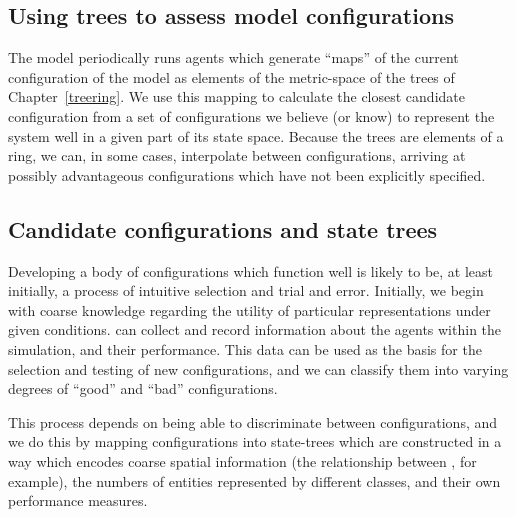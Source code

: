 \subsection{Using trees to assess model configurations}

The model periodically runs  agents which generate
``maps'' of the current configuration of the model as elements of
the metric-space of the trees of Chapter~\ref{treering}.  We use
this mapping to calculate the closest candidate configuration from a
set of configurations we believe (or know) to represent the system
well in a given part of its state space. Because the trees are
elements of a ring, we can, in some cases, interpolate between
configurations, arriving at possibly advantageous configurations which
have not been explicitly specified.

\subsection{Candidate configurations and state trees}

Developing a body of configurations which function well is likely to
be, at least initially, a process of intuitive selection and trial and
error. Initially, we begin with coarse knowledge regarding the utility
of particular representations under given conditions. \mloggers can
collect and record information about the agents within the simulation,
and their performance. This data can be used as the basis for the
selection and testing of new configurations, and we can classify them
into varying degrees of ``good'' and ``bad'' configurations.

This process depends on being able to discriminate between
configurations, and we do this by mapping configurations into
state-trees which are constructed in a way which encodes coarse
spatial information (the relationship between \mpatches, for example),
the numbers of entities represented by different classes, and their
own performance measures.



